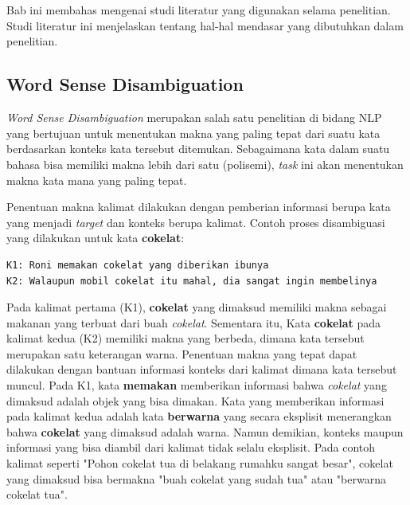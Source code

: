 \chapter{\babDua}
Bab ini membahas mengenai studi literatur yang digunakan selama penelitian. Studi literatur ini menjelaskan tentang hal-hal mendasar yang dibutuhkan dalam penelitian.

\section{Word Sense Disambiguation}
\textit{Word Sense Disambiguation} merupakan salah satu penelitian di bidang NLP yang bertujuan untuk menentukan makna yang paling tepat dari suatu kata berdasarkan konteks kata tersebut ditemukan. Sebagaimana kata dalam suatu bahasa bisa memiliki makna lebih dari satu (polisemi), \textit{task} ini akan menentukan makna kata mana yang paling tepat. 

Penentuan makna kalimat dilakukan dengan pemberian informasi berupa kata yang menjadi \textit{target} dan konteks berupa kalimat. Contoh proses disambiguasi yang dilakukan untuk kata \textbf{cokelat}:

\begin{lstlisting}
K1: Roni memakan cokelat yang diberikan ibunya
K2: Walaupun mobil cokelat itu mahal, dia sangat ingin membelinya
\end{lstlisting}


Pada kalimat pertama (K1), \textbf{cokelat} yang dimaksud memiliki makna sebagai makanan yang terbuat dari buah \textit{cokelat}. Sementara itu, Kata \textbf{cokelat} pada kalimat kedua (K2) memiliki makna yang berbeda, dimana kata tersebut merupakan satu keterangan warna. Penentuan makna yang tepat dapat dilakukan dengan bantuan informasi konteks dari kalimat dimana kata tersebut muncul. Pada K1, kata \textbf{memakan} memberikan informasi bahwa \textit{cokelat} yang dimaksud adalah objek yang bisa dimakan. Kata yang memberikan informasi pada kalimat kedua adalah kata \textbf{berwarna} yang secara eksplisit menerangkan bahwa \textbf{cokelat} yang dimaksud adalah warna. Namun demikian, konteks maupun informasi yang bisa diambil dari kalimat tidak selalu eksplisit. Pada contoh kalimat seperti "Pohon cokelat tua di belakang rumahku sangat besar", cokelat yang dimaksud bisa bermakna "buah cokelat yang sudah tua" atau "berwarna cokelat tua".

